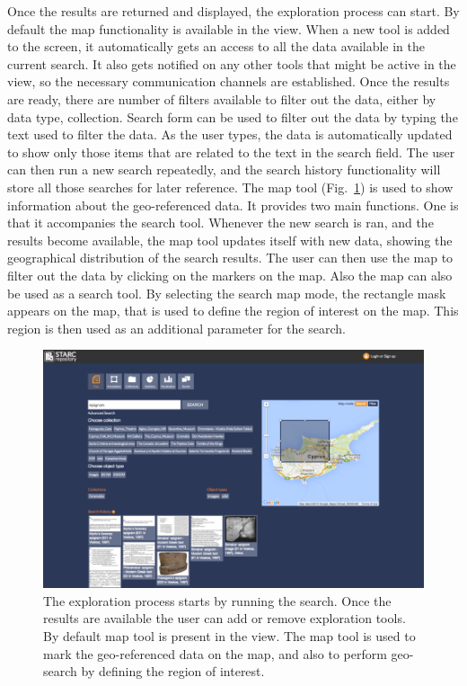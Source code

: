 \documentclass[amsthm,ebook]{saparticle}
\begin{document}
Once the results are returned and displayed, the exploration process can start. By default the map functionality is
available in the view. When a new tool is added to the screen, it automatically gets an access to all the data
available in the current search. It also gets notified on any other tools that might be active in the view, so the
necessary communication channels are established. Once the results are ready, there are number of filters available to
filter out the data, either by data type, collection. Search form can be used to filter out the data by typing the text
used to filter the data. As the user types, the data is automatically updated to show only those items that are related
to the text in the search field. The user can then run a new search repeatedly, and the search history functionality
will store all those searches for later reference. The map tool (Fig.~\ref{fig:1}) is used to show information about the
geo-referenced data. It provides two main functions. One is that it accompanies the search tool. Whenever the new
search is ran, and the results become available, the map tool updates itself with new data, showing the geographical distribution of the search results. The user can then use the map to filter out the data by clicking on the
markers on the map. Also the map can also be used as a search tool. By selecting the search map mode, the rectangle
mask appears on the map, that is used to define the region of interest on the map. This region is then used as an
additional parameter for the search. 

\begin{figure}[!bp]
\centering
 \includegraphics[width=\columnwidth]{DamnjanovicetalEAGLE2016-img001.png}
\caption{The exploration process starts by running the search. Once the results are available the user can add or remove
exploration tools. By default map tool is present in the view. The map tool is used to mark the geo-referenced data on
the map, and also to perform geo-search by defining the region of interest. }
\label{fig:1}
\end{figure}
\end{document}
